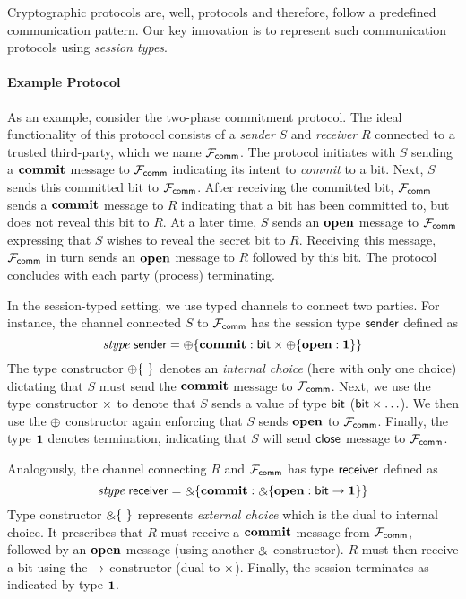 Cryptographic protocols are, well, protocols and therefore, follow
a predefined communication pattern.
Our key innovation is to represent such communication protocols using
\emph{session types}.

\paragraph*{\textbf{Example Protocol}}
As an example, consider the two-phase commitment protocol.
The ideal functionality of this protocol consists of a \emph{sender} $S$
and \emph{receiver} $R$ connected to a trusted third-party, which we
name $\mathcal{F}_{{\mathsf {comm}}}$.
The protocol initiates with $S$ sending a $\mathbf{commit}$ message to $\mathcal{F}_{{\mathsf {comm}}}$
indicating its intent to \emph{commit} to a bit.
Next, $S$ sends this committed bit to $\mathcal{F}_{{\mathsf {comm}}}$.
After receiving the committed bit, $\mathcal{F}_{{\mathsf {comm}}}$ sends a $\mathbf{commit}$ message
to $R$ indicating that a bit has been committed to, but does not reveal
this bit to $R$.
At a later time, $S$ sends an $\mathbf{open}$ message to $\mathcal{F}_{{\mathsf {comm}}}$ expressing
that $S$ wishes to reveal the secret bit to $R$.
Receiving this message, $\mathcal{F}_{{\mathsf {comm}}}$ in turn sends an $\mathbf{open}$ message
to $R$ followed by this bit.
The protocol concludes with each party (process) terminating.

In the session-typed setting, we use typed channels to connect two
parties. For instance, the channel connected $S$ to $\mathcal{F}_{{\mathsf {comm}}}$
has the session type $\mathsf{sender}$ defined as
\[
  \relax{\it stype} \; \mathsf{sender} = \oplus \{ \mathbf{commit} : \mathsf{bit} \times
  \oplus \{ \mathbf{open} : \mathbf{1} \} \}
\]
The type constructor $\ichoice$ denotes an \emph{internal choice}
(here with only one choice) dictating that $S$ must send the
$\mathbf{commit}$ message to $\mathcal{F}_{{\mathsf {comm}}}$.
Next, we use the type constructor $\times$ to denote that $S$
sends a value of type $\mathsf{bit}$ ($\mathsf{bit} \times \ldots$).
We then use the $\oplus$ constructor again enforcing
that $S$ sends $\mathbf{open}$ to $\mathcal{F}_{{\mathsf {comm}}}$.
Finally, the type $\mathbf{1}$ denotes termination, indicating that
$S$ will send $\mathsf{close}$ message to $\mathcal{F}_{{\mathsf {comm}}}$.

Analogously, the channel connecting $R$ and $\mathcal{F}_{{\mathsf {comm}}}$ has
type $\mathsf{receiver}$ defined as
\[
  \relax{\it stype} \; \mathsf{receiver} = \mathbin{\binampersand} \{ \mathbf{commit} : 
  \mathbin{\binampersand} \{ \mathbf{open} : \mathsf{bit} \rightarrow \mathbf{1} \} \}
\]
Type constructor $\echoice$ represents \emph{external choice}
which is the dual to internal choice.
It prescribes that $R$ must receive a $\mathbf{commit}$ message from $\mathcal{F}_{{\mathsf {comm}}}$,
followed by an $\mathbf{open}$ message (using another $\mathbin{\binampersand}$ constructor).
$R$ must then receive a bit using the $\rightarrow$ constructor (dual to
$\times$).
Finally, the session terminates as indicated by type $\mathbf{1}$.

